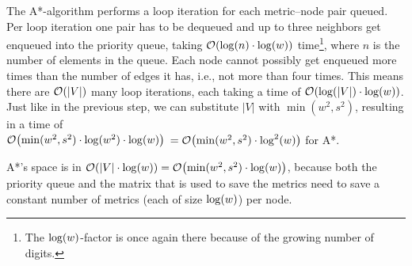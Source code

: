 \documentclass[sigconf,nonacm,screen]{acmart}
\begin{document}
The A*-algorithm performs a loop iteration for each metric--node pair queued. Per loop iteration one pair has to be dequeued and up to three neighbors get enqueued into the priority queue, taking $\mathcal{O}\hspace{-0.15em}\left(\log(n)\cdot\log(w)\right)$ time\footnote{The $\log(w)$-factor is once again there because of the growing number of digits.}, where $n$ is the number of elements in the queue. Each node cannot possibly get enqueued more times than the number of edges it has, %
i.e., not more than four times. This means there are $\mathcal{O}\hspace{-0.15em}\left(|V|\right)$ many loop iterations, each taking a time of $\mathcal{O}\hspace{-0.15em}\left(\log(|V|)\cdot\log(w)\right)$. Just like in the previous step, we can substitute $|V|$ with $\min(w^2,s^2)$, resulting in a time of \\$\mathcal{O}\hspace{-0.15em}\left(\min(w^2,s^2)\cdot\log(w^2)\cdot\log(w)\right)$
$= \mathcal{O}\hspace{-0.15em}\left(\min(w^2,s^2)\cdot\log^2(w)\right)$ for A*.

A*'s space is in $\mathcal{O}\hspace{-0.15em}\left(|V|\cdot\log(w)\right) = \mathcal{O}\hspace{-0.15em}\left(\min(w^2,s^2)\cdot\log(w)\right)$, because both the priority queue and the matrix that is used to save the metrics need to save a constant number of metrics (each of size $\log(w)$) per node.
\end{document}
